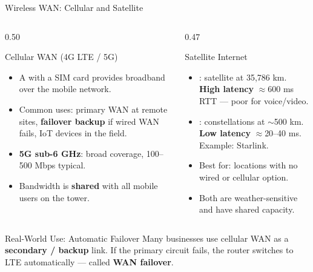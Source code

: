 \documentclass[aspectratio=169]{beamer}  %
\begin{document}
\begin{frame}[t]{Wireless WAN: Cellular and Satellite}
    \begin{columns}[T]
        \begin{column}{0.50\textwidth}
            \begin{block}{Cellular WAN (4G LTE / 5G)}
                \begin{itemize}
                    \footnotesize
                    \item A  with a SIM card provides broadband over the mobile network.
                    \item Common uses: primary WAN at remote sites, \textbf{failover backup} if wired WAN fails, IoT devices in the field.
                    \item \textbf{5G sub-6 GHz}: broad coverage, 100--500 Mbps typical.
                    \item Bandwidth is \textbf{shared} with all mobile users on the tower.
                \end{itemize}
            \end{block}
        \end{column}
        \begin{column}{0.47\textwidth}
            \begin{block}{Satellite Internet}
                \begin{itemize}
                    \footnotesize
                    \item {}: satellite at 35,786 km. \textbf{High latency} $\approx$600 ms RTT --- poor for voice/video.
                    \item {}: constellations at $\sim$500 km. \textbf{Low latency} $\approx$20--40 ms. Example: Starlink.
                    \item Best for: locations with no wired or cellular option.
                    \item Both are weather-sensitive and have shared capacity.
                \end{itemize}
            \end{block}
        \end{column}
    \end{columns}
    \vspace{0.1em}
    \begin{exampleblock}{Real-World Use: Automatic Failover}
        \footnotesize
        Many businesses use cellular WAN as a \textbf{secondary / backup} link. If the primary circuit fails, the router switches to LTE automatically --- called \textbf{WAN failover}.
    \end{exampleblock}
\end{frame}
\end{document}
